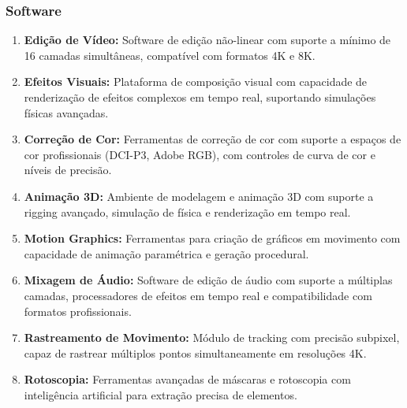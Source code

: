 \subsubsection{Software}
\begin{enumerate}[leftmargin=*]
    \item \textbf{Edição de Vídeo:} Software de edição não-linear com suporte a mínimo de 16 camadas simultâneas, compatível com formatos 4K e 8K.
    \item \textbf{Efeitos Visuais:} Plataforma de composição visual com capacidade de renderização de efeitos complexos em tempo real, suportando simulações físicas avançadas.
    \item \textbf{Correção de Cor:} Ferramentas de correção de cor com suporte a espaços de cor profissionais (DCI-P3, Adobe RGB), com controles de curva de cor e níveis de precisão.
    \item \textbf{Animação 3D:} Ambiente de modelagem e animação 3D com suporte a rigging avançado, simulação de física e renderização em tempo real.
    \item \textbf{Motion Graphics:} Ferramentas para criação de gráficos em movimento com capacidade de animação paramétrica e geração procedural.
    \item \textbf{Mixagem de Áudio:} Software de edição de áudio com suporte a múltiplas camadas, processadores de efeitos em tempo real e compatibilidade com formatos profissionais.
    \item \textbf{Rastreamento de Movimento:} Módulo de tracking com precisão subpixel, capaz de rastrear múltiplos pontos simultaneamente em resoluções 4K.
    \item \textbf{Rotoscopia:} Ferramentas avançadas de máscaras e rotoscopia com inteligência artificial para extração precisa de elementos.
\end{enumerate}

